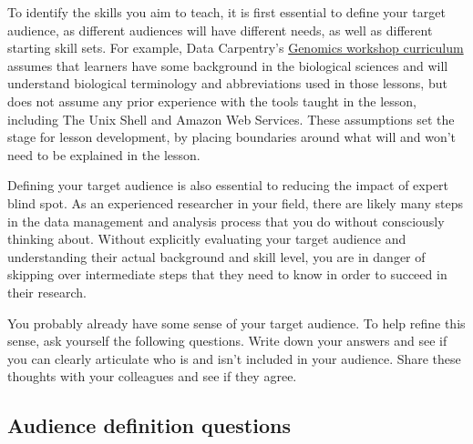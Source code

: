 \documentclass[]{book}
\begin{document}
To identify the skills you aim to teach, it is first essential to define your
target audience, as different audiences will have different needs, as well as different starting skill sets. For
example, Data Carpentry's \href{https://datacarpentry.org/genomics-workshop/}{Genomics workshop curriculum} assumes
that learners have some background in the biological sciences and will understand biological terminology and
abbreviations used in those lessons, but does not assume any prior experience with the tools taught in the lesson,
including The Unix Shell and Amazon Web Services. These assumptions set the stage for lesson development, by
placing boundaries around what will and won't need to be explained in the lesson.

Defining your target audience is also essential to reducing the impact of expert
blind spot. As an experienced researcher in your field, there are likely many steps in the data
management and analysis process that you do without consciously thinking about. Without
explicitly evaluating your target audience and understanding their actual background
and skill level, you are in danger of skipping over intermediate steps that they
need to know in order to succeed in their research.

You probably already have some sense of your target audience. To help refine this sense, ask yourself the
following questions. Write down your answers and see if you can clearly articulate who is and isn't included
in your audience. Share these thoughts with your colleagues and see if they agree.

\hypertarget{audience-definition-questions}{%
\subsection{Audience definition questions}\label{audience-definition-questions}}
\end{document}
